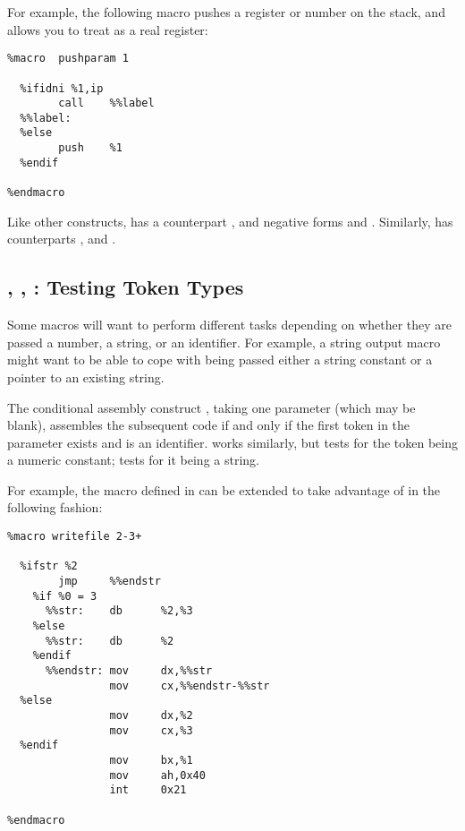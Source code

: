 For example, the following macro pushes a register or number on the
stack, and allows you to treat  as a real register:

\begin{lstlisting}
%macro  pushparam 1

  %ifidni %1,ip
        call    %%label
  %%label:
  %else
        push    %1
  %endif

%endmacro
\end{lstlisting}

Like other  constructs,  has a counterpart
, and negative forms  and
. Similarly,  has counterparts
,  and .

\label{subsec:iftyp}
\subsection{, , : Testing Token Types}

Some macros will want to perform different tasks depending on
whether they are passed a number, a string, or an identifier. For
example, a string output macro might want to be able to cope with
being passed either a string constant or a pointer to an existing
string.

The conditional assembly construct , taking one parameter
(which may be blank), assembles the subsequent code if and only if
the first token in the parameter exists and is an identifier.
 works similarly, but tests for the token being a numeric
constant;  tests for it being a string.

For example, the  macro defined in 
can be extended to take advantage of  in the following fashion:

\begin{lstlisting}
%macro writefile 2-3+

  %ifstr %2
        jmp     %%endstr
    %if %0 = 3
      %%str:    db      %2,%3
    %else
      %%str:    db      %2
    %endif
      %%endstr: mov     dx,%%str
                mov     cx,%%endstr-%%str
  %else
                mov     dx,%2
                mov     cx,%3
  %endif
                mov     bx,%1
                mov     ah,0x40
                int     0x21

%endmacro
\end{lstlisting}

